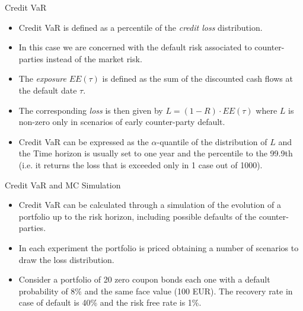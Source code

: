 \documentclass{beamer}
\begin{document}
\begin{frame}{Credit VaR}
  \begin{itemize}	
    \item Credit VaR is defined as a percentile of the \emph{credit loss} distribution. 
    \item In this case we are concerned with the default risk associated to counter-parties instead of the market risk.
    \item The \emph{exposure} $EE(\tau)$ is defined as the sum of the discounted cash flows at the default date $\tau$. 
    \item The corresponding \emph{loss} is then given by $L =(1-R)\cdot EE(\tau)$ where $L$ is non-zero only in scenarios of early counter-party default.
    \item Credit VaR can be expressed as the $\alpha$-quantile of the distribution of $L$ and the Time horizon is usually set to one year and the percentile to the 99.9th (i.e. it returns the loss that is exceeded only in 1 case out of 1000).
  \end{itemize}
\end{frame}
  
\begin{frame}{Credit VaR and MC Simulation}
  \begin{itemize}
    \item Credit VaR can be calculated through a simulation of the evolution of a portfolio up to the risk horizon, including possible defaults of the counter-parties.
    \item In each experiment the portfolio is priced obtaining a number of scenarios to draw the loss distribution.
    \item Consider a portfolio of 20 zero coupon bonds each one with a default probability of 8\% and the same face value (100 EUR). The recovery rate in case of default is 40\% and the risk free rate is 1\%.
    \end{itemize}
\end{frame}
\end{document}
